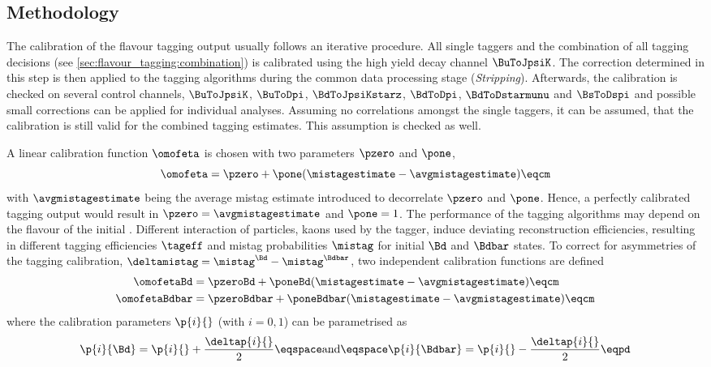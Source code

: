 \subsection{Methodology}
\label{sec:flavour_tagging:calibration:method}

The calibration of the flavour tagging output usually follows an iterative
procedure. All single taggers and the combination of all \OS tagging decisions
(see \cref{sec:flavour_tagging:combination}) is calibrated using the high yield
decay channel $\BuToJpsiK$. The correction determined in this step is then
applied to the tagging algorithms during the common data processing stage
(\emph{Stripping}). Afterwards, the calibration is checked on several control
channels, \ie $\BuToJpsiK$, $\BuToDpi$, $\BdToJpsiKstarz$, $\BdToDpi$,
$\BdToDstarmunu$ and $\BsToDspi$ and possible small corrections can be applied
for individual analyses. Assuming no correlations amongst the single taggers, it
can be assumed, that the calibration is still valid for the combined tagging
estimates. This assumption is checked as well.

A linear calibration function $\omofeta$ is chosen with two parameters $\pzero$
and $\pone$,
%
\begin{equation}\label{eq:flavour_tagging:calibration:method:calibration}
  \omofeta = \pzero + \pone (\mistagestimate - \avgmistagestimate)\eqcm
\end{equation}
%
with $\avgmistagestimate$ being the average mistag estimate introduced to
decorrelate $\pzero$ and $\pone$. Hence, a perfectly calibrated tagging output
would result in $\pzero = \avgmistagestimate$ and $\pone = 1$. The performance
of the tagging algorithms may depend on the flavour of the initial \Bmeson.
Different interaction of particles, \eg kaons used by the \OSK tagger, induce
deviating reconstruction efficiencies, resulting in different tagging
efficiencies $\tageff$ and mistag probabilities $\mistag$ for initial $\Bd$ and
$\Bdbar$ states. To correct for asymmetries of the tagging calibration,
$\deltamistag = \mistag^{\Bd} - \mistag^{\Bdbar}$, two independent calibration
functions are defined
%
\begin{equation}\label{eq:flavour_tagging:calibration:method:asymmetric_calibration:omega}
  \begin{split}
    \omofetaBd    &= \pzeroBd    + \poneBd    (\mistagestimate - \avgmistagestimate)\eqcm \\
    \omofetaBdbar &= \pzeroBdbar + \poneBdbar (\mistagestimate - \avgmistagestimate)\eqcm
  \end{split}
\end{equation}
%
where the calibration parameters $\p{i}{}$ (with $i=0,1$) can be parametrised as
%
\begin{equation}\label{eq:flavour_tagging:calibration:method:asymmetric_calibration:ps}
  \p{i}{\Bd} = \p{i}{} + \frac{\deltap{i}{}}{2} \eqspace\text{and}\eqspace \p{i}{\Bdbar} = \p{i}{} - \frac{\deltap{i}{}}{2}\eqpd
\end{equation}


